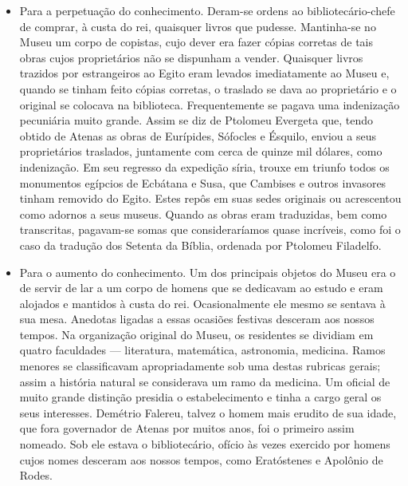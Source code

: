 \documentclass[11pt,a5paper,twoside,openany]{book}
\begin{document}
\begin{itemize}
\item Para a perpetuação do conhecimento. Deram-se ordens ao bibliotecário-chefe de comprar, à custa do rei, quaisquer livros que pudesse. Mantinha-se no Museu um corpo de copistas, cujo dever era fazer cópias corretas de tais obras cujos proprietários não se dispunham a vender. Quaisquer livros trazidos por estrangeiros ao Egito eram levados imediatamente ao Museu e, quando se tinham feito cópias corretas, o traslado se dava ao proprietário e o original se colocava na biblioteca. Frequentemente se pagava uma indenização pecuniária muito grande. Assim se diz de Ptolomeu Evergeta que, tendo obtido de Atenas as obras de Eurípides, Sófocles e Ésquilo, enviou a seus proprietários traslados, juntamente com cerca de quinze mil dólares, como indenização. Em seu regresso da expedição síria, trouxe em triunfo todos os monumentos egípcios de Ecbátana e Susa, que Cambises e outros invasores tinham removido do Egito. Estes repôs em suas sedes originais ou acrescentou como adornos a seus museus. Quando as obras eram traduzidas, bem como transcritas, pagavam-se somas que consideraríamos quase incríveis, como foi o caso da tradução dos Setenta da Bíblia, ordenada por Ptolomeu Filadelfo.
\end{itemize}
\begin{itemize}
\item Para o aumento do conhecimento. Um dos principais objetos do Museu era o de servir de lar a um corpo de homens que se dedicavam ao estudo e eram alojados e mantidos à custa do rei. Ocasionalmente ele mesmo se sentava à sua mesa. Anedotas ligadas a essas ocasiões festivas desceram aos nossos tempos. Na organização original do Museu, os residentes se dividiam em quatro faculdades — literatura, matemática, astronomia, medicina. Ramos menores se classificavam apropriadamente sob uma destas rubricas gerais; assim a história natural se considerava um ramo da medicina. Um oficial de muito grande distinção presidia o estabelecimento e tinha a cargo geral os seus interesses. Demétrio Falereu, talvez o homem mais erudito de sua idade, que fora governador de Atenas por muitos anos, foi o primeiro assim nomeado. Sob ele estava o bibliotecário, ofício às vezes exercido por homens cujos nomes desceram aos nossos tempos, como Eratóstenes e Apolônio de Rodes.
\end{itemize}
\end{document}
